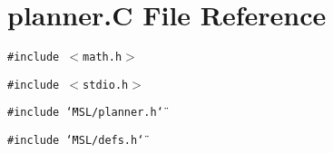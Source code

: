 \section{planner.C File Reference}
\label{planner_8C}
{\tt \#include $<$math.h$>$}\par
{\tt \#include $<$stdio.h$>$}\par
{\tt \#include \char`\"{}MSL/planner.h\char`\"{}}\par
{\tt \#include \char`\"{}MSL/defs.h\char`\"{}}\par

